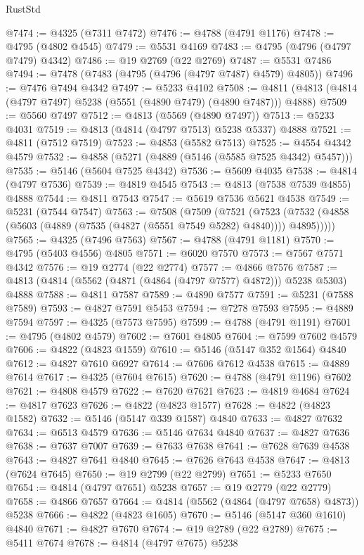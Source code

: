 \begin{lexlean}{RustStd}
\begin{coremodule}
@7474 := @4325 (@7311 @7472)
@7476 := @4788 (@4791 @1176)
@7478 := @4795 (@4802 @4545)
@7479 := @5531 @4169
@7483 := @4795 (@4796 (@4797 @7479) @4342)
@7486 := @19 @2769 (@22 @2769)
@7487 := @5531 @7486
@7494 := @7478 (@7483 (@4795 (@4796 (@4797 @7487) @4579) @4805))
@7496 := @7476 @7494 @4342
@7497 := @5233 @4102
@7508 := @4811 (@4813 (@4814 (@4797 @7497) @5238 (@5551 (@4890 @7479) (@4890 @7487))) @4888)
@7509 := @5560 @7497
@7512 := @4813 (@5569 (@4890 @7497))
@7513 := @5233 @4031
@7519 := @4813 (@4814 (@4797 @7513) @5238 @5337) @4888
@7521 := @4811 (@7512 @7519)
@7523 := @4853 (@5582 @7513)
@7525 := @4554 @4342 @4579
@7532 := @4858 (@5271 (@4889 (@5146 (@5585 @7525 @4342) @5457)))
@7535 := @5146 (@5604 @7525 @4342)
@7536 := @5609 @4035
@7538 := @4814 (@4797 @7536)
@7539 := @4819 @4545
@7543 := @4813 (@7538 @7539 @4855) @4888
@7544 := @4811 @7543
@7547 := @5619 @7536 @5621 @4538
@7549 := @5231 (@7544 @7547)
@7563 := @7508
    (@7509
      (@7521
        (@7523 (@7532 (@4858 (@5603 (@4889 (@7535 (@4827 (@5551 @7549 @5282) @4840)))) @4895)))))
@7565 := @4325 (@7496 @7563)
@7567 := @4788 (@4791 @1181)
@7570 := @4795 (@5403 @4556) @4805
@7571 := @6020 @7570
@7573 := @7567 @7571 @4342
@7576 := @19 @2774 (@22 @2774)
@7577 := @4866 @7576
@7587 := @4813 (@4814 (@5562 (@4871 (@4864 (@4797 @7577) @4872))) @5238 @5303) @4888
@7588 := @4811 @7587
@7589 := @4890 @7577
@7591 := @5231 (@7588 @7589)
@7593 := @4827 @7591 @5453
@7594 := @7278 @7593
@7595 := @4889 @7594
@7597 := @4325 (@7573 @7595)
@7599 := @4788 (@4791 @1191)
@7601 := @4795 (@4802 @4579)
@7602 := @7601 @4805
@7604 := @7599 @7602 @4579
@7606 := @4822 (@4823 @1559)
@7610 := @5146 (@5147 @352 @1564) @4840
@7612 := @4827 @7610 @6927
@7614 := @7606 @7612 @4538
@7615 := @4889 @7614
@7617 := @4325 (@7604 @7615)
@7620 := @4788 (@4791 @1196) @7602
@7621 := @4808 @4579
@7622 := @7620 @7621
@7623 := @4819 @4684
@7624 := @4817 @7623
@7626 := @4822 (@4823 @1577)
@7628 := @4822 (@4823 @1582)
@7632 := @5146 (@5147 @339 @1587) @4840
@7633 := @4827 @7632
@7634 := @6513 @4579
@7636 := @5146 @7634 @4840
@7637 := @4827 @7636
@7638 := @7637 @7007
@7639 := @7633 @7638
@7641 := @7628 @7639 @4538
@7643 := @4827 @7641 @4840
@7645 := @7626 @7643 @4538
@7647 := @4813 (@7624 @7645)
@7650 := @19 @2799 (@22 @2799)
@7651 := @5233 @7650
@7654 := @4814 (@4797 @7651) @5238
@7657 := @19 @2779 (@22 @2779)
@7658 := @4866 @7657
@7664 := @4814 (@5562 (@4864 (@4797 @7658) @4873)) @5238
@7666 := @4822 (@4823 @1605)
@7670 := @5146 (@5147 @360 @1610) @4840
@7671 := @4827 @7670
@7674 := @19 @2789 (@22 @2789)
@7675 := @5411 @7674
@7678 := @4814 (@4797 @7675) @5238

\end{coremodule}
\end{lexlean}
